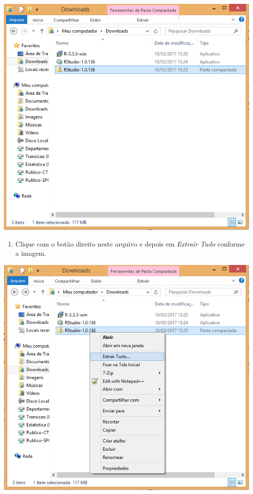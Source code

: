 \documentclass[
]{book}
\providecommand{\tightlist}{%
  \setlength{\itemsep}{0pt}\setlength{\parskip}{0pt}}
\begin{document}
\begin{center}\includegraphics[width=9.03in]{img/instalacao/rstudio-zip} \end{center}

\begin{enumerate}
\def\labelenumi{\arabic{enumi}.}
\setcounter{enumi}{2}
\tightlist
\item
  Clique com o botão direito neste arquivo e depois em \emph{Extrair Tudo} conforme a imagem.
\end{enumerate}

\begin{center}\includegraphics[width=9.07in]{img/instalacao/rstudio-extrair} \end{center}
\end{document}
